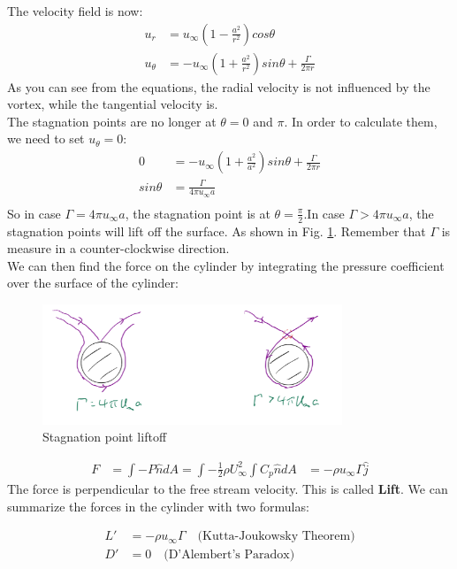 \documentclass{article}
\begin{document}
The velocity field is now:
\begin{align*}
    u_r &= u_{\infty}\left(1-\frac{a^2}{r^2}\right)cos\theta\\
    u_\theta &= -u_{\infty}\left(1+\frac{a^2}{r^2}\right)sin\theta+\frac{\Gamma}{2\pi r}
\end{align*}
As you can see from the equations, the radial velocity is not influenced by the vortex, while the tangential velocity is.\\
The stagnation points are no longer at $\theta=0$ and $\pi$. In order to calculate them, we need to set $u_\theta=0$:
\begin{align*}
    0 &= -u_{\infty}\left(1+\frac{a^2}{a^2}\right)sin\theta+\frac{\Gamma}{2\pi r}\\
    sin\theta&=\frac{\Gamma}{4\pi u_\infty a}\\
\end{align*}
So in case $\Gamma=4\pi u_\infty a$, the stagnation point is at $\theta=\frac{\pi}{2}$.In case $\Gamma>4\pi u_\infty a$, the stagnation points will lift off the surface. As shown in Fig. \ref{fig:Stagnation point liftoff.png}. Remember that $\Gamma$ is measure in a counter-clockwise direction.\\
We can then find the force on the cylinder by integrating the pressure coefficient over the surface of the cylinder:
\begin{figure}
    \centering
    \includegraphics[width=0.8\textwidth]{Stagnation point liftoff.png}
    \caption{Stagnation point liftoff}
    \label{fig:Stagnation point liftoff.png}
\end{figure}
\begin{align*}
    F & = \int -P \hat{n} dA=\int -\frac{1}{2}\rho U_\infty ^2 \int C_p \hat{n} dA
    & = -\rho u_\infty \Gamma \hat{j}
\end{align*}
The force is perpendicular to the free stream velocity. This is called \textbf{Lift}. We can summarize the forces in the cylinder with two formulas:
\begin{mymathbox}
    \begin{align}
        L'&=-\rho u_\infty \Gamma \quad \text{(Kutta-Joukowsky Theorem)} \\
        D'&=0 \quad \text{(D'Alembert's Paradox)}
    \end{align}
\end{mymathbox}
\end{document}
